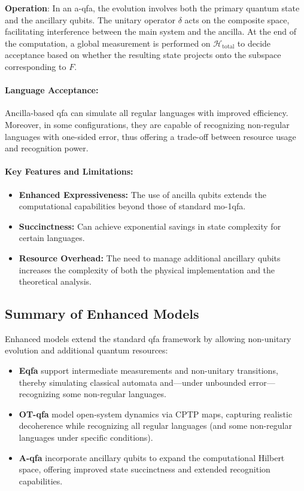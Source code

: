 \textbf{Operation}:  
In an \gls{a-qfa}, the evolution involves both the primary quantum state and the ancillary qubits. The unitary operator \(\delta\) acts on the composite space, facilitating interference between the main system and the ancilla. At the end of the computation, a global measurement is performed on \(\mathcal{H}_{\text{total}}\) to decide acceptance based on whether the resulting state projects onto the subspace corresponding to \( F \).

\paragraph{Language Acceptance:}  
Ancilla-based qfa can simulate all regular languages with improved efficiency. Moreover, in some configurations, they are capable of recognizing non-regular languages with one-sided error, thus offering a trade-off between resource usage and recognition power.

\paragraph{Key Features and Limitations:}
\begin{itemize}
    \item \textbf{Enhanced Expressiveness:} The use of ancilla qubits extends the computational capabilities beyond those of standard mo-1qfa.
    \item \textbf{Succinctness:} Can achieve exponential savings in state complexity for certain languages.
    \item \textbf{Resource Overhead:} The need to manage additional ancillary qubits increases the complexity of both the physical implementation and the theoretical analysis.
\end{itemize}

\subsection*{Summary of Enhanced Models}
Enhanced models extend the standard qfa framework by allowing non-unitary evolution and additional quantum resources:
\begin{itemize}
    \item \textbf{Eqfa} support intermediate measurements and non-unitary transitions, thereby simulating classical automata and—under unbounded error—recognizing some non-regular languages.
    \item \textbf{OT-qfa} model open-system dynamics via CPTP maps, capturing realistic decoherence while recognizing all regular languages (and some non-regular languages under specific conditions).
    \item \textbf{A-qfa} incorporate ancillary qubits to expand the computational Hilbert space, offering improved state succinctness and extended recognition capabilities.
\end{itemize}

